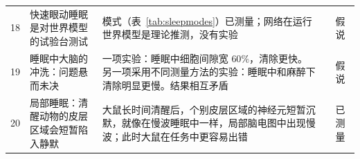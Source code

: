 {\begin{longtable}{>{\raggedright}p{0.5cm}>{\raggedright}p{4.0cm}>{\raggedright}p{5.6cm}>{\raggedright}p{2.3cm}>{\raggedright\arraybackslash}p{1.7cm}}
18 & 快速眼动睡眠是对世界模型的试验台测试 & 模式（表~\ref{tab:sleepmodes}）已测量；网络在运行世界模型是理论推测，没有实验 & \cite{Hobson2009} & 假说 \\
19 & 睡眠中大脑的冲洗：问题悬而未决 & 一项实验：睡眠中细胞间隙宽 $60\%$，清除更快。另一项采用不同测量方法的实验：睡眠中和麻醉下清除明显更慢。结果相互矛盾 & \cite{Xie2013,Miao2024} & 假说 \\
20 & 局部睡眠：清醒动物的皮层区域会短暂陷入静默 & 大鼠长时间清醒后，个别皮层区域的神经元短暂沉默，就像在慢波睡眠中一样，局部脑电图中出现慢波；此时大鼠在任务中更容易出错 & \cite{Vyazovskiy2011} & 已测量 \\
\bottomrule
\end{longtable}}
